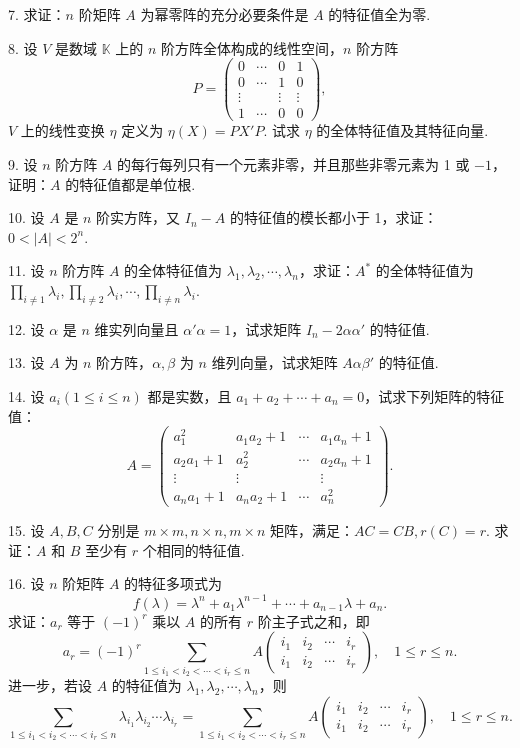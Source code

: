\documentclass[UTF8, 12pt, fontset=fandol, oneside]{ctexart}
\begin{document}
7. 求证：$n$ 阶矩阵 $A$ 为幂零阵的充分必要条件是 $A$ 的特征值全为零.

8. 设 $V$ 是数域 $\mathbb{K}$ 上的 $n$ 阶方阵全体构成的线性空间，$n$ 阶方阵
\[
P=\left(\begin{array}{cccc}
0 & \cdots & 0 & 1\\
0 & \cdots & 1 & 0\\
\vdots & & \vdots & \vdots\\
1 & \cdots & 0 & 0
\end{array}\right),
\]
$V$ 上的线性变换 $\eta$ 定义为 $\eta(X)=PX'P$. 试求 $\eta$ 的全体特征值及其特征向量.

9. 设 $n$ 阶方阵 $A$ 的每行每列只有一个元素非零，并且那些非零元素为 1 或 $-1$，证明：$A$ 的特征值都是单位根.

10. 设 $A$ 是 $n$ 阶实方阵，又 $I_n-A$ 的特征值的模长都小于 1，求证：$0<|A|<2^n$.

11. 设 $n$ 阶方阵 $A$ 的全体特征值为 $\lambda_1,\lambda_2,\cdots,\lambda_n$，求证：$A^*$ 的全体特征值为 $\prod_{i\neq 1}\lambda_i,\prod_{i\neq 2}\lambda_i,\cdots,\prod_{i\neq n}\lambda_i$.

12. 设 $\alpha$ 是 $n$ 维实列向量且 $\alpha'\alpha=1$，试求矩阵 $I_n-2\alpha\alpha'$ 的特征值.

13. 设 $A$ 为 $n$ 阶方阵，$\alpha,\beta$ 为 $n$ 维列向量，试求矩阵 $A\alpha\beta'$ 的特征值.

14. 设 $a_i(1\leq i\leq n)$ 都是实数，且 $a_1+a_2+\cdots+a_n=0$，试求下列矩阵的特征值：
\[
A=\left(\begin{array}{cccc}
a_1^2 & a_1a_2+1 & \cdots & a_1a_n+1\\
a_2a_1+1 & a_2^2 & \cdots & a_2a_n+1\\
\vdots & \vdots & & \vdots\\
a_na_1+1 & a_na_2+1 & \cdots & a_n^2
\end{array}\right).
\]

15. 设 $A,B,C$ 分别是 $m\times m,n\times n,m\times n$ 矩阵，满足：$AC=CB,r(C)=r$. 求证：$A$ 和 $B$ 至少有 $r$ 个相同的特征值.

16. 设 $n$ 阶矩阵 $A$ 的特征多项式为
\[
f(\lambda)=\lambda^n+a_1\lambda^{n-1}+\cdots+a_{n-1}\lambda+a_n.
\]
求证：$a_r$ 等于 $(-1)^r$ 乘以 $A$ 的所有 $r$ 阶主子式之和，即
\[
a_r=(-1)^r\sum_{1\leq i_1<i_2<\cdots<i_r\leq n}
A\left(\begin{array}{cccc}
i_1 & i_2 & \cdots & i_r\\
i_1 & i_2 & \cdots & i_r
\end{array}\right),\quad 1\leq r\leq n.
\]
进一步，若设 $A$ 的特征值为 $\lambda_1,\lambda_2,\cdots,\lambda_n$，则
\[
\sum_{1\leq i_1<i_2<\cdots<i_r\leq n}\lambda_{i_1}\lambda_{i_2}\cdots\lambda_{i_r}
=
\sum_{1\leq i_1<i_2<\cdots<i_r\leq n}
A\left(\begin{array}{cccc}
i_1 & i_2 & \cdots & i_r\\
i_1 & i_2 & \cdots & i_r
\end{array}\right),\quad 1\leq r\leq n.
\]
\end{document}
